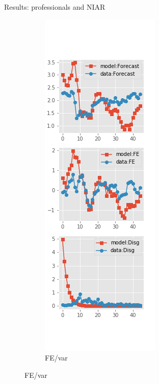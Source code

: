 \documentclass{beamer}
\begin{document}
\begin{frame}{Results: professionals and NIAR}
\begin{figure}[ht]
\begin{subfigure}[b]{0.19\textwidth}
		\end{subfigure}
		\hfill
		\begin{subfigure}[b]{0.19\textwidth}
			\caption{FE/var}
			\includegraphics[width=\textwidth, height = 0.8\textheight]{figuresDraft/spf_ni_est_diag3.png}

\end{subfigure}
\end{figure}
\end{frame}
\end{document}
